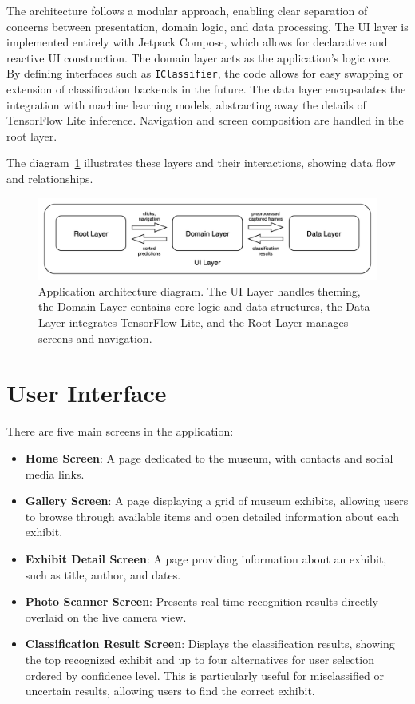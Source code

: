 The architecture follows a modular approach, enabling clear separation of concerns between presentation, domain logic, and data processing. The UI layer is implemented entirely with Jetpack Compose, which allows for declarative and reactive UI construction. The domain layer acts as the application's logic core. By defining interfaces such as \texttt{IClassifier}, the code allows for easy swapping or extension of classification backends in the future. The data layer encapsulates the integration with machine learning models, abstracting away the details of TensorFlow Lite inference. Navigation and screen composition are handled in the root layer.

The diagram~\ref{fig:architecture} illustrates these layers and their interactions, showing data flow and relationships.

\begin{figure}[h]
    \centering
    \includegraphics[width=\textwidth]{img/architecture-diagram.png}
    \caption{Application architecture diagram. The UI Layer handles theming, the Domain Layer contains core logic and data structures, the Data Layer integrates TensorFlow Lite, and the Root Layer manages screens and navigation.}\label{fig:architecture}
\end{figure}

\section{User Interface}

There are five main screens in the application:

\begin{itemize}
\item \textbf{Home Screen}: A page dedicated to the museum, with contacts and social media links.
\item \textbf{Gallery Screen}: A page displaying a grid of museum exhibits, allowing users to browse through available items and open detailed information about each exhibit.
\item \textbf{Exhibit Detail Screen}: A page providing information about an exhibit, such as title, author, and dates.
\item \textbf{Photo Scanner Screen}: Presents real-time recognition results directly overlaid on the live camera view.
\item \textbf{Classification Result Screen}: Displays the classification results, showing the top recognized exhibit and up to four alternatives for user selection ordered by confidence level. This is particularly useful for misclassified or uncertain results, allowing users to find the correct exhibit.
\end{itemize}

